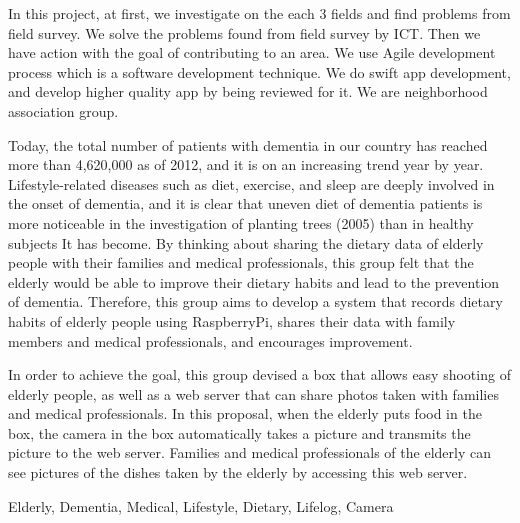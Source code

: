 \documentclass[../report]{subfiles}
\begin{document}
\begin{eabstract}
In this project, at first, we investigate on the each 3 fields and find problems from field survey.
We solve the problems found from field survey by ICT.
Then we have action with the goal of contributing to an area.
We use Agile development process which is a software development technique.
We do swift app development, and develop higher quality app by being reviewed for it.
We are neighborhood association group.

Today, the total number of patients with dementia in our country has reached more than 4,620,000 as of 2012, and it is on an increasing trend year by year.
Lifestyle-related diseases such as diet, exercise, and sleep are deeply involved in the onset of dementia, and it is clear that uneven diet of dementia patients is more noticeable in the investigation of planting trees (2005) than in healthy subjects It has become.
By thinking about sharing the dietary data of elderly people with their families and medical professionals, this group felt that the elderly would be able to improve their dietary habits and lead to the prevention of dementia.
Therefore, this group aims to develop a system that records dietary habits of elderly people using RaspberryPi, shares their data with family members and medical professionals, and encourages improvement.

In order to achieve the goal, this group devised a box that allows easy shooting of elderly people, as well as a web server that can share photos taken with families and medical professionals.
In this proposal, when the elderly puts food in the box, the camera in the box automatically takes a picture and transmits the picture to the web server.
Families and medical professionals of the elderly can see pictures of the dishes taken by the elderly by accessing this web server.
\begin{ekeyword}
Elderly, Dementia, Medical, Lifestyle, Dietary, Lifelog, Camera
\end{ekeyword}
\end{eabstract}
\end{document}
